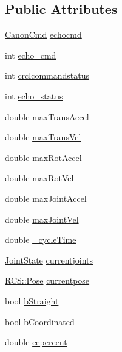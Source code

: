 \subsection*{Public Attributes}
\begin{DoxyCompactItemize}
\item 
\hyperlink{structRCS_1_1CanonCmd}{Canon\-Cmd} \hyperlink{structRCS_1_1CanonWorldModel_ac7e75df0508ec626b834a77ebfe0465f}{echocmd}
\item 
int \hyperlink{structRCS_1_1CanonWorldModel_a120915aac1c50a1e4f4856dccff23fdc}{echo\-\_\-cmd}
\item 
int \hyperlink{structRCS_1_1CanonWorldModel_aa68c655c78e0897dc5fda1bf90fc60aa}{crclcommandstatus}
\item 
int \hyperlink{structRCS_1_1CanonWorldModel_a31810c18d1846d6c86d84b01831a2408}{echo\-\_\-status}
\item 
double \hyperlink{structRCS_1_1CanonWorldModel_a9b6d5469341e73289788ba0fe0f3c57a}{max\-Trans\-Accel}
\item 
double \hyperlink{structRCS_1_1CanonWorldModel_a55824e72d1d92c8b5f5c8ecf3b7c7a00}{max\-Trans\-Vel}
\item 
double \hyperlink{structRCS_1_1CanonWorldModel_aca5f8ebce128e94ed4edf3caabb6c363}{max\-Rot\-Accel}
\item 
double \hyperlink{structRCS_1_1CanonWorldModel_acbb472eee22bb4764dc865476fe56950}{max\-Rot\-Vel}
\item 
double \hyperlink{structRCS_1_1CanonWorldModel_ac20eae577122dd6dc58f92f33c1de53c}{max\-Joint\-Accel}
\item 
double \hyperlink{structRCS_1_1CanonWorldModel_a29c9099062e430196fc659fd7ae2f8ef}{max\-Joint\-Vel}
\item 
double \hyperlink{structRCS_1_1CanonWorldModel_a8b14e4665c3491b8a68977dbf84c9479}{\-\_\-cycle\-Time}
\item 
\hyperlink{RCS_8h_aa4adb93a26caa4dacba9c9614e283245}{Joint\-State} \hyperlink{structRCS_1_1CanonWorldModel_a0060a81cde9ecf9ae02c5e61b8345a5b}{currentjoints}
\item 
\hyperlink{namespaceRCS_aa07e45d8a50e30064283d2b38087f999}{R\-C\-S\-::\-Pose} \hyperlink{structRCS_1_1CanonWorldModel_a7220d95245ac8a787e35efb2cc399cb5}{currentpose}
\item 
bool \hyperlink{structRCS_1_1CanonWorldModel_a964a4af06dd3db891d707d23fa64fbd1}{b\-Straight}
\item 
bool \hyperlink{structRCS_1_1CanonWorldModel_af198ecfa0d77755403c7002b633d6734}{b\-Coordinated}
\item 
double \hyperlink{structRCS_1_1CanonWorldModel_ad74c7f3831a2b2cef7854fd294209412}{eepercent}
\end{DoxyCompactItemize}


